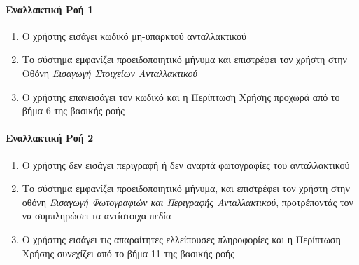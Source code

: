 \documentclass{../ol-softwaremanual}
\begin{document}
	
	\paragraph{Εναλλακτική Ροή 1}
	
	\begin{enumerate}
		\item Ο χρήστης εισάγει κωδικό μη-υπαρκτού ανταλλακτικού
		\item Το σύστημα εμφανίζει προειδοποιητικό μήνυμα και επιστρέφει τον χρήστη στην Οθόνη \textit{Εισαγωγή Στοιχείων Ανταλλακτικού}
		\item Ο χρήστης επανεισάγει τον κωδικό και η Περίπτωση Χρήσης προχωρά από το βήμα 6 της βασικής ροής
	\end{enumerate}
	
	\paragraph{Εναλλακτική Ροή 2}
	
	\begin{enumerate}
		\item Ο χρήστης δεν εισάγει περιγραφή ή δεν αναρτά φωτογραφίες του ανταλλακτικού
		\item Το σύστημα εμφανίζει προειδοποιητικό μήνυμα, και επιστρέφει τον χρήστη στην οθόνη \textit{Εισαγωγή Φωτογραφιών και Περιγραφής Ανταλλακτικού}, προτρέποντάς τον να συμπληρώσει τα αντίστοιχα πεδία
		\item Ο χρήστης εισάγει τις απαραίτητες ελλείπουσες πληροφορίες και η Περίπτωση Χρήσης συνεχίζει από το βήμα 11 της βασικής ροής
	\end{enumerate}
	
	
\end{document}
